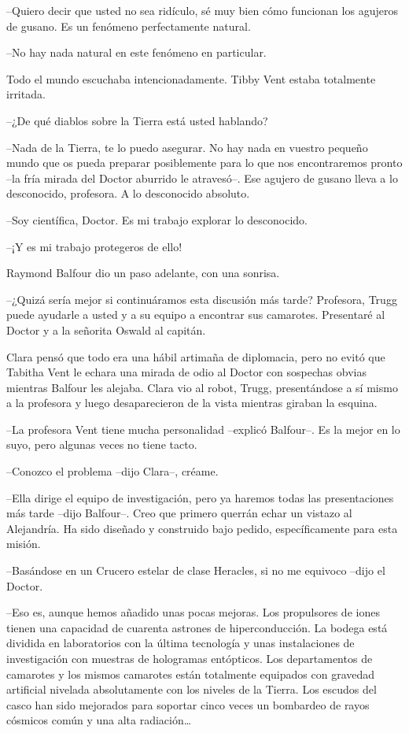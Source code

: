 {--Quiero decir que usted no sea ridículo, sé muy bien cómo funcionan los
agujeros de gusano. Es un fenómeno perfectamente natural.}

{--No hay nada natural en este fenómeno en particular.}

{Todo el mundo escuchaba intencionadamente. Tibby Vent estaba totalmente
irritada.}

{--¿De qué diablos sobre la Tierra está usted hablando?}

{--Nada de la Tierra, te lo puedo asegurar. No hay nada en vuestro
 pequeño mundo que os pueda preparar posiblemente para lo que nos
 encontraremos pronto --la fría mirada del Doctor aburrido le atravesó--.
 Ese agujero de gusano lleva a lo desconocido, profesora. A lo
desconocido absoluto.}

{--Soy científica, Doctor. Es mi trabajo explorar lo desconocido.}

{--¡Y es mi trabajo protegeros de ello!}

{Raymond Balfour dio un paso adelante, con una sonrisa.}

{--¿Quizá sería mejor si continuáramos esta discusión más tarde?
 Profesora, Trugg puede ayudarle a usted y a su equipo a encontrar sus
camarotes. Presentaré al Doctor y a la señorita Oswald al capitán.}

{Clara pensó que todo era una hábil artimaña de diplomacia, pero no evitó
 que Tabitha Vent le echara una mirada de odio al Doctor con sospechas
 obvias mientras Balfour les alejaba. Clara vio al robot, Trugg,
 presentándose a sí mismo a la profesora y luego desaparecieron de la
vista mientras giraban la esquina.}

{--La profesora Vent tiene mucha personalidad --explicó Balfour--. Es la
mejor en lo suyo, pero algunas veces no tiene tacto.}

{--Conozco el problema --dijo Clara--, créame.}

{--Ella dirige el equipo de investigación, pero ya haremos todas las
 presentaciones más tarde --dijo Balfour--. Creo que primero querrán
 echar un vistazo al Alejandría. Ha sido diseñado y construido bajo
pedido, específicamente para esta misión.}

{--Basándose en un Crucero estelar de clase Heracles, si no me equivoco
--dijo el Doctor.}

{--Eso es, aunque hemos añadido unas pocas mejoras. Los propulsores de
 iones tienen una capacidad de cuarenta astrones de hiperconducción. La
 bodega está dividida en laboratorios con la última tecnología y unas
 instalaciones de investigación con muestras de hologramas entópticos.
 Los departamentos de camarotes y los mismos camarotes están totalmente
 equipados con gravedad artificial nivelada absolutamente con los niveles
 de la Tierra. Los escudos del casco han sido mejorados para soportar
 cinco veces un bombardeo de rayos cósmicos común y una alta
 radiación\ldots{}}

